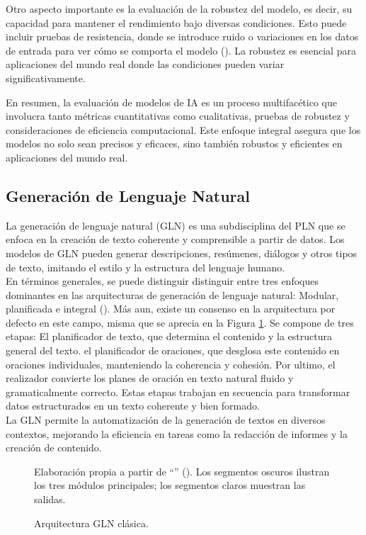 Otro aspecto importante es la evaluación de la robustez del modelo, es decir, su capacidad para mantener el rendimiento bajo diversas condiciones. Esto puede incluir pruebas de resistencia, donde se introduce ruido o variaciones en los datos de entrada para ver cómo se comporta el modelo (\cite{hendrycks2019benchmarking}). La robustez es esencial para aplicaciones del mundo real donde las condiciones pueden variar significativamente.

En resumen, la evaluación de modelos de IA es un proceso multifacético que involucra tanto métricas cuantitativas como cualitativas, pruebas de robustez y consideraciones de eficiencia computacional. Este enfoque integral asegura que los modelos no solo sean precisos y eficaces, sino también robustos y eficientes en aplicaciones del mundo real.

\subsection{Generación de Lenguaje Natural}
La generación de lenguaje natural (GLN) es una subdisciplina del PLN que se enfoca en la creación de texto coherente y comprensible a partir de datos. Los modelos de GLN pueden generar descripciones, resúmenes, diálogos y otros tipos de texto, imitando el estilo y la estructura del lenguaje humano.\\
En términos generales, se puede distinguir distinguir entre tres enfoques dominantes en las arquitecturas de generación de lenguaje natural: Modular, planificada e integral (\cite{gatt2018survey}).
Más aun, existe un consenso en la arquitectura por defecto en este campo, misma que se aprecia en la Figura \ref{fig:nlg_architecture}. Se compone de tres etapas: El planificador de texto, que determina el contenido y la estructura general del texto. el planificador de oraciones, que desglosa este contenido en oraciones individuales, manteniendo la coherencia y cohesión. Por ultimo, el realizador convierte los planes de oración en texto natural fluido y gramaticalmente correcto. Estas etapas trabajan en secuencia para transformar datos estructurados en un texto coherente y bien formado.\\
La GLN permite la automatización de la generación de textos en diversos contextos, mejorando la eficiencia en tareas como la redacción de informes y la creación de contenido.

\begin{figure}[htb]
	\centering
    
	\caption{Arquitectura GLN clásica.}
	\footnotesize{{Elaboración propia a partir de ``\textit{}'' (\citeyear{gatt2018survey}). Los segmentos oscuros ilustran los tres módulos principales; los segmentos claros muestran las salidas.}}
	\label{fig:nlg_architecture} 
\end{figure}

